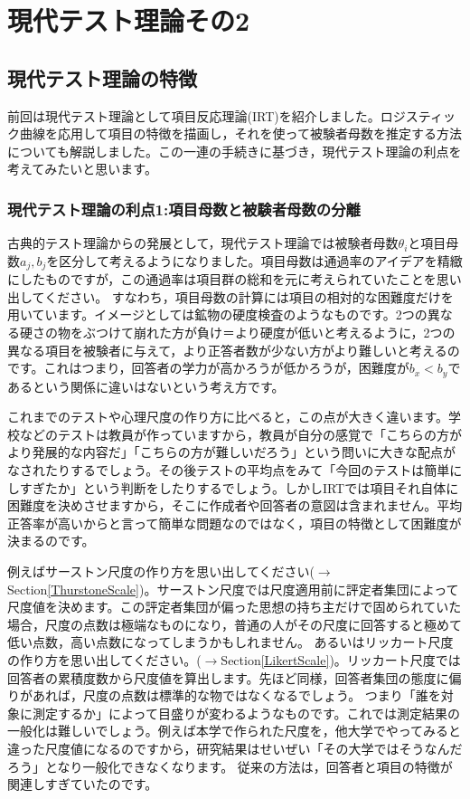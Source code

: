 \documentclass{ltjsbook}
\begin{document}
 
\chapter{現代テスト理論その2} 
\label{chapter5} 

\section{現代テスト理論の特徴}
前回は現代テスト理論として項目反応理論(IRT)を紹介しました。ロジスティック曲線を応用して項目の特徴を描画し，それを使って被験者母数を推定する方法についても解説しました。この一連の手続きに基づき，現代テスト理論の利点を考えてみたいと思います。
\subsection{現代テスト理論の利点1:項目母数と被験者母数の分離}
古典的テスト理論からの発展として，現代テスト理論では被験者母数$\theta_i$と項目母数$a_j, b_j$を区分して考えるようになりました。項目母数は通過率のアイデアを精緻にしたものですが，この通過率は項目群の総和を元に考えられていたことを思い出してください。
すなわち，項目母数の計算には項目の相対的な困難度だけを用いています。イメージとしては鉱物の硬度検査のようなものです。2つの異なる硬さの物をぶつけて崩れた方が負け＝より硬度が低いと考えるように，2つの異なる項目を被験者に与えて，より正答者数が少ない方がより難しいと考えるのです。これはつまり，回答者の学力が高かろうが低かろうが，困難度が$b_x < b_y$であるという関係に違いはないという考え方です。

これまでのテストや心理尺度の作り方に比べると，この点が大きく違います。学校などのテストは教員が作っていますから，教員が自分の感覚で「こちらの方がより発展的な内容だ」「こちらの方が難しいだろう」という問いに大きな配点がなされたりするでしょう。その後テストの平均点をみて「今回のテストは簡単にしすぎたか」という判断をしたりするでしょう。しかしIRTでは項目それ自体に困難度を決めさせますから，そこに作成者や回答者の意図は含まれません。平均正答率が高いからと言って簡単な問題なのではなく，項目の特徴として困難度が決まるのです。

例えばサーストン尺度の作り方を思い出してください($\to$Section\ref{ThurstoneScale})。サーストン尺度では尺度適用前に評定者集団によって尺度値を決めます。この評定者集団が偏った思想の持ち主だけで固められていた場合，尺度の点数は極端なものになり，普通の人がその尺度に回答すると極めて低い点数，高い点数になってしまうかもしれません。
あるいはリッカート尺度の作り方を思い出してください。($\to$Section\ref{LikertScale})。リッカート尺度では回答者の累積度数から尺度値を算出します。先ほど同様，回答者集団の態度に偏りがあれば，尺度の点数は標準的な物ではなくなるでしょう。
つまり「誰を対象に測定するか」によって目盛りが変わるようなものです。これでは測定結果の一般化は難しいでしょう。例えば本学で作られた尺度を，他大学でやってみると違った尺度値になるのですから，研究結果はせいぜい「その大学ではそうなんだろう」となり一般化できなくなります。
従来の方法は，回答者と項目の特徴が関連しすぎていたのです。
\end{document}
